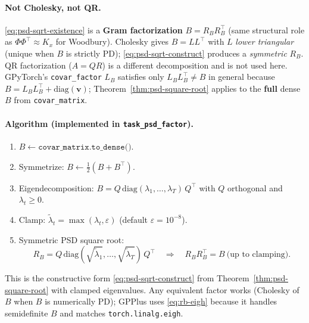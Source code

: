 \documentclass[11pt]{article}
\theoremstyle{plain}
\newcommand{\Ph}{\Phi}
\newcommand{\LB}{L_B}
\newcommand{\RB}{R_B}
\begin{document}
\paragraph{Not Cholesky, not QR.}
\eqref{eq:psd-sqrt-existence} is a \textbf{Gram factorization} $B = \RB\RB^\top$ (same structural
role as $\Ph\Ph^\top \approx K_x$ for Woodbury).
Cholesky gives $B = LL^\top$ with $L$ \emph{lower triangular} (unique when $B$ is strictly PD);
\eqref{eq:psd-sqrt-construct} produces a \emph{symmetric} $\RB$.
QR factorization ($A=QR$) is a different decomposition and is not used here.
GPyTorch's \texttt{covar\_factor} $\LB$ satisfies only $\LB\LB^\top \ne B$ in general because
$B = \LB\LB^\top + \mathrm{diag}(\mathbf{v})$; Theorem~\ref{thm:psd-square-root} applies to the
\textbf{full} dense $B$ from \texttt{covar\_matrix}.

\paragraph{Algorithm (implemented in \texttt{task\_psd\_factor}).}
\begin{enumerate}[nosep]
  \item $B \leftarrow \texttt{covar\_matrix.to\_dense()}$.
  \item Symmetrize: $B \leftarrow \tfrac{1}{2}(B + B^\top)$.
  \item Eigendecomposition: $B = Q\,\mathrm{diag}(\lambda_1,\ldots,\lambda_T)\,Q^\top$
        with $Q$ orthogonal and $\lambda_t \ge 0$.
  \item Clamp: $\tilde{\lambda}_t = \max(\lambda_t, \varepsilon)$ (default $\varepsilon = 10^{-8}$).
  \item Symmetric PSD square root:
        \begin{equation}
          \label{eq:rb-eigh}
          \RB = Q\,\mathrm{diag}(\sqrt{\tilde{\lambda}_1},\ldots,\sqrt{\tilde{\lambda}_T})\,Q^\top
          \quad\Rightarrow\quad \RB\RB^\top = B \ \text{(up to clamping)}.
        \end{equation}
\end{enumerate}
This is the constructive form \eqref{eq:psd-sqrt-construct} from Theorem~\ref{thm:psd-square-root}
with clamped eigenvalues.
Any equivalent factor works (Cholesky of $B$ when $B$ is numerically PD); GPPlus uses
\eqref{eq:rb-eigh} because it handles semidefinite $B$ and matches \texttt{torch.linalg.eigh}.
\end{document}
